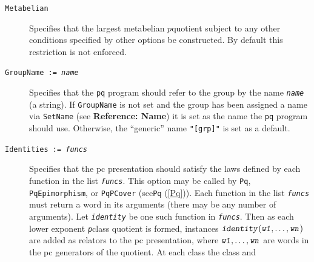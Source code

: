 \documentclass[a4paper,11pt]{report}
\begin{document}
{{\begin{description}
\item[{\texttt{Metabelian} \label{option Metabelian}}]  Specifies that the largest metabelian $p$\texttt{}quotient subject to any other conditions specified by
other options be constructed. By default this restriction is not enforced. 
\item[{\texttt{GroupName := \mbox{\texttt{\mdseries\slshape name}}} \label{option GroupName}}]  Specifies that the \texttt{pq} program should refer to the group by the name \mbox{\texttt{\mdseries\slshape name}} (a string). If \texttt{GroupName} is not set and the group has been assigned a name via \texttt{SetName} (see{\nobreakspace} \textbf{Reference: Name}) it is set as the name the \texttt{pq} program should use. Otherwise, the ``generic'' name \texttt{"[grp]"} is set as a default. 
\item[{\texttt{Identities := \mbox{\texttt{\mdseries\slshape funcs}}} \label{option Identities}}]  Specifies that the pc presentation should satisfy the laws defined by each
function in the list \mbox{\texttt{\mdseries\slshape funcs}}. This option may be called by \texttt{Pq}, \texttt{PqEpimorphism}, or \texttt{PqPCover} (see{\nobreakspace}\texttt{Pq} (\ref{Pq})). Each function in the list \mbox{\texttt{\mdseries\slshape funcs}} must return a word in its arguments (there may be any number of arguments).
Let \mbox{\texttt{\mdseries\slshape identity}} be one such function in \mbox{\texttt{\mdseries\slshape funcs}}. Then as each lower exponent \mbox{\texttt{\mdseries\slshape p}}\texttt{}class quotient is formed, instances $\mbox{\texttt{\mdseries\slshape identity}}(\mbox{\texttt{\mdseries\slshape w1}}, \dots, \mbox{\texttt{\mdseries\slshape wn}})$ are added as relators to the pc presentation, where $\mbox{\texttt{\mdseries\slshape w1}}, \dots, \mbox{\texttt{\mdseries\slshape wn}}$ are words in the pc generators of the quotient. At each class the class and

\end{description}}}
\end{document}
